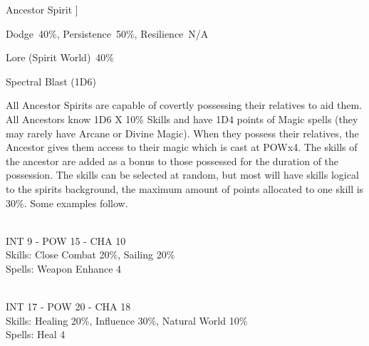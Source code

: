 \begin{samepage}
\begin{monsterbox}{Ancestor Spirit}
	]
	\rpghline%
	\stats[ %
		STR = -,
		CON = -,
		DEX = -,
		SIZ = -,
		INT = 3D6    (11),
		POW = 3D6+6  (17),
		CHA = 3D6    (11)
	]
	\rpghline%
	\begin{rpg-monsteraction}[Resistances]
		Dodge~40\%, Persistence~50\%, Resilience~N/A
	\end{rpg-monsteraction}
	\begin{rpg-monsteraction}[Knowledge]
		Lore (Spirit World)~40\%
	\end{rpg-monsteraction}
	\begin{rpg-monsteraction}
		Spectral Blast (1D6)
	\end{rpg-monsteraction}
	\begin{rpg-monsteraction}
		All Ancestor Spirits are capable of covertly possessing their relatives to aid them. All Ancestors know 1D6 X 10\% Skills and have 1D4 points of Magic spells (they may rarely have Arcane or Divine Magic). When they possess their relatives, the Ancestor gives them access to their magic which is cast at POWx4. The skills of the ancestor are added as a bonus to those possessed for the duration of the possession. The skills can be selected at random, but most will have skills logical to the spirits background, the maximum amount of points allocated to one skill is 30\%. Some examples follow.
	\end{rpg-monsteraction}
	\begin{rpg-monsteraction}
		\\INT 9 - POW 15 - CHA 10\\
		Skills: Close Combat 20\%, Sailing 20\%\\
                Spells: Weapon Enhance 4
	\end{rpg-monsteraction}

	\begin{rpg-monsteraction}
		\\INT 17 - POW 20 - CHA 18\\
		Skills: Healing 20\%, Influence 30\%, Natural World 10\%\\
                Spells: Heal 4
	\end{rpg-monsteraction}
\end{monsterbox}
\end{samepage}

